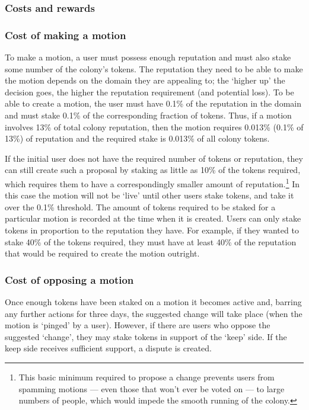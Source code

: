 \subsubsection{Costs and rewards}\label{sec:costs-of-motions}

\subsubsection*{Cost of making a motion}

To make a motion, a user must possess enough reputation and must also stake some number of the colony's tokens. The reputation they need to be able to make the motion depends on the domain they are appealing to; the `higher up' the decision goes, the higher the reputation requirement (and potential loss). To be able to create a motion, the user must have 0.1\% of the reputation in the domain and must stake 0.1\% of the corresponding fraction of tokens. Thus, if a motion involves 13\% of total colony reputation, then the motion requires 0.013\% (0.1\% of 13\%) of reputation and the required stake is 0.013\% of all colony tokens.

If the initial user does not have the required number of tokens or reputation, they can still create such a proposal by staking as little as 10\% of the tokens required, which requires them to have a correspondingly smaller amount of reputation.\footnote{This basic minimum required to propose a change prevents users from spamming motions --- even those that won’t ever be voted on --- to large numbers of people, which would impede the smooth running of the colony.} In this case the motion will not be `live' until other users stake tokens, and take it over the 0.1\% threshold. The  amount of tokens required to be staked for a particular motion is recorded at the time when it is created. Users can only stake tokens in proportion to the reputation they have. For example, if they wanted to stake 40\% of the tokens required, they must have at least 40\% of the reputation that would be required to create the motion outright.

\subsubsection*{Cost of opposing a motion}

Once enough tokens have been staked on a motion it becomes active and, barring any further actions for three days, the suggested change will take place (when the motion is `pinged' by a user). However, if there are users who oppose the suggested `change', they may stake tokens in support of the `keep' side. If the keep side receives sufficient support, a dispute is created.

